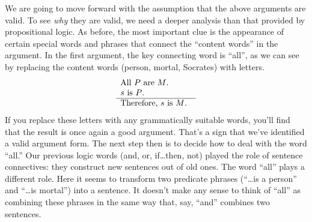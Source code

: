 We are going to move forward with the assumption that the above
arguments are valid.  To see {\it why} they are valid, we need a
deeper analysis than that provided by propositional logic.  As before,
the most important clue is the appearance of certain special words and
phrases that connect the ``content words'' in the argument.  In the
first argument, the key connecting word is ``all'', as we can see by
replacing the content words (person, mortal, Socrates) with letters.
\[ \begin{array}{p{3cm}}
     All $P$ are $M$. \\
     $s$ is $P$. \\ \hline Therefore, $s$ is $M$. 
   \end{array} \]  If you replace these letters with any grammatically suitable words,
 you'll find that the result is once again a good argument.  That's a
 sign that we've identified a valid argument form.  The next step then
 is to decide how to deal with the word ``all.''  Our previous logic words
 (and, or, if\dots then, not) played the role of sentence connectives:
 they construct new sentences out of old ones.  The word ``all'' plays
 a different role.  Here it seems to transform two predicate phrases
 (``\dots is a person'' and ``\dots is mortal'') into a sentence.  It
 doesn't make any sense to think of
 ``all'' as combining these phrases
 in the same way that, say, ``and'' combines two sentences.  

